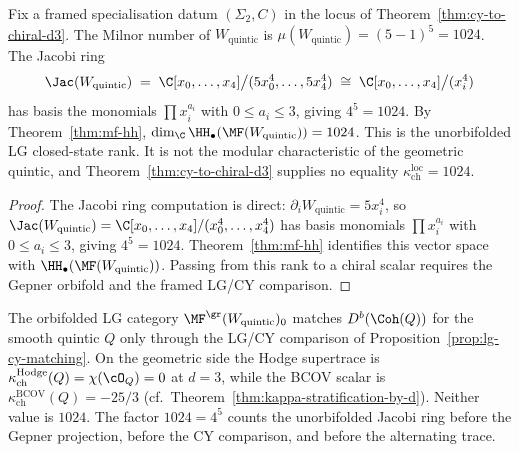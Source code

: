 \begin{proposition}
\label{prop:quintic-milnor}
Fix a framed specialisation datum $(\Sigma_2,C)$ in the locus of Theorem~\ref{thm:cy-to-chiral-d3}. The Milnor number of $W_{\mathrm{quintic}}$ is $\mu(W_{\mathrm{quintic}}) = (5-1)^5 = 1024$. The Jacobi ring
\[
 \Jac(W_{\mathrm{quintic}}) \;=\; \C[x_0, \ldots, x_4]\big/(5x_0^4, \ldots, 5x_4^4) \;\cong\; \C[x_0, \ldots, x_4]\big/(x_i^4)
\]
has basis the monomials $\prod x_i^{a_i}$ with $0 \leq a_i \leq 3$, giving $4^5 = 1024$. By Theorem~\ref{thm:mf-hh}, $\dim_\C \HH_\bullet(\MF(W_{\mathrm{quintic}})) = 1024$. This is the unorbifolded LG closed-state rank. It is not the modular characteristic of the geometric quintic, and Theorem~\ref{thm:cy-to-chiral-d3} supplies no equality $\kappa_{\mathrm{ch}}^{\mathrm{loc}}=1024$.
\end{proposition}

\begin{proof}
The Jacobi ring computation is direct: $\partial_i W_{\mathrm{quintic}} = 5x_i^4$, so $\Jac(W_{\mathrm{quintic}}) = \C[x_0, \ldots, x_4]/(x_0^4, \ldots, x_4^4)$ has basis monomials $\prod x_i^{a_i}$ with $0 \leq a_i \leq 3$, giving $4^5 = 1024$. Theorem~\ref{thm:mf-hh} identifies this vector space with $\HH_\bullet(\MF(W_{\mathrm{quintic}}))$. Passing from this rank to a chiral scalar requires the Gepner orbifold and the framed LG/CY comparison.
\end{proof}

\begin{remark}
\label{rem:quintic-orbifold-discrepancy}
The orbifolded LG category $\MF^{\gr}(W_{\mathrm{quintic}})_0$ matches $D^b(\Coh(Q))$ for the smooth quintic $Q$ only through the LG/CY comparison of Proposition~\ref{prop:lg-cy-matching}. On the geometric side the Hodge supertrace is $\kappa_{\mathrm{ch}}^{\mathrm{Hodge}}(Q)=\chi(\cO_Q)=0$ at $d = 3$, while the BCOV scalar is $\kappa_{\mathrm{ch}}^{\mathrm{BCOV}}(Q)=-25/3$ (cf.\ Theorem~\ref{thm:kappa-stratification-by-d}). Neither value is $1024$. The factor $1024 = 4^5$ counts the unorbifolded Jacobi ring before the Gepner projection, before the CY comparison, and before the alternating trace.
\end{remark}

